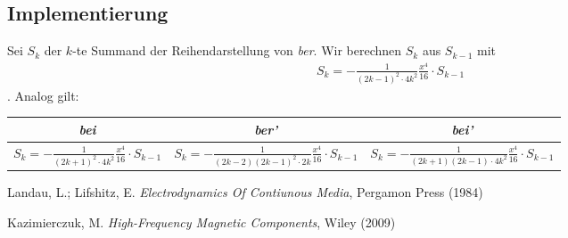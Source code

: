 \documentclass[10pt,a4paper]{article}
\begin{document}
\subsection{Implementierung}

Sei $S_k$ der $k$-te Summand der Reihendarstellung von \emph{ber}. Wir berechnen $S_k$ aus $S_{k-1}$ mit
\begin{align}
	S_k=-\frac{1}{(2k-1)^2\cdot4k^2}\frac{x^4}{16}\cdot S_{k-1}
\end{align}.
Analog gilt:\newline
\begin{tabular}{c|c|c}
\rule[1ex]{0pt}{2.5ex} \emph{bei} & \emph{ber'} & \emph{bei'} \\ 
\hline 
\rule[1ex]{0pt}{2.5ex} $S_k=-\frac{1}{(2k+1)^2\cdot4k^2}\frac{x^4}{16}\cdot S_{k-1}$ & $S_k=-\frac{1}{(2k-2)(2k-1)^2\cdot 2k}\frac{x^4}{16}\cdot S_{k-1}$ & $S_k=-\frac{1}{(2k+1)(2k-1) \cdot 4k^2}\frac{x^4}{16}\cdot S_{k-1}$ \\ 
\end{tabular}
\begin{thebibliography}{9}

Landau, L.; Lifshitz, E.
\emph{Electrodynamics Of Contiunous Media},
Pergamon Press (1984)

Kazimierczuk, M.
\emph{High-Frequency Magnetic Components},
Wiley (2009)

\end{thebibliography}
\end{document}
